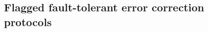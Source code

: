 \documentclass[acmsmall,screen,review,anonymous,nonacm]{acmart}
\begin{document}







% 
% 





\subsection{Flagged fault-tolerant error correction protocols}
\label{subsec:flagged-protocols}
\end{document}
